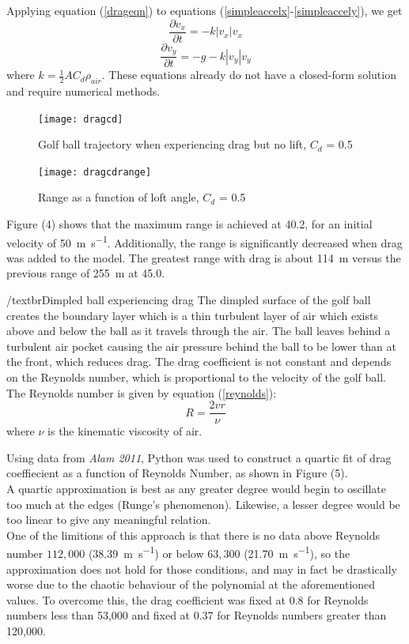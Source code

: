 \documentclass[12pt]{article}
\begin{document}
Applying equation (\ref{drageqn}) to equations (\ref{simpleaccelx}-\ref{simpleaccely}), we get
\begin{equation} \label{dragaccelx}
\frac{\partial v_x}{\partial t}=-k |v_x| v_x
\end{equation}
\begin{equation} \label{dragaccely}
\frac{\partial v_y}{\partial t}=-g-k |v_y| v_y
\end{equation}
where $k=\frac{1}{2} A C_d \rho_{air}$. These equations already do not have a closed-form solution and require numerical methods.
\begin{figure}[H]
\centering
\caption{Golf ball trajectory when experiencing drag but no lift, $C_d$ = 0.5}
\texttt{[image: dragcd]}
\end{figure}

\begin{figure}[H]
\centering
\caption{Range as a function of loft angle, $C_d$ = 0.5}
\texttt{[image: dragcdrange]}
\end{figure}

Figure (4) shows that the maximum range is achieved at 40.2\degree, for an initial velocity of \SI{50}{\metre\per\second}. Additionally, the range is significantly decreased when drag was added to the model. The greatest range with drag is about \SI{114}{\metre} versus the previous range of \SI{255}{\metre} at 45.0\degree.

/textbr{Dimpled ball experiencing drag}
The dimpled surface of the golf ball creates the boundary layer which is a thin turbulent layer of air which exists above and below the ball as it travels through the air. The ball leaves behind a turbulent air pocket causing the air pressure behind the ball to be lower than at the front, which reduces drag.
The drag coefficient is not constant and depends on the Reynolds number, which is proportional to the velocity of the golf ball. The Reynolds number is given by equation (\ref{reynolds})\cite{Alam2011}:
\begin{equation} \label{reynolds}
R=\frac{2vr}{\nu}
\end{equation}
where $\nu$ is the kinematic viscosity of air.

Using data from \textit{Alam 2011}\cite{Alam2011}, Python was used to construct a quartic fit of drag coeffiecient as a function of Reynolds Number, as shown in Figure (5).\\
A quartic approximation is best as any greater degree would begin to oscillate too much at the edges (Runge's phenomenon). Likewise, a lesser degree would be too linear to give any meaningful relation.\\
One of the limitions of this approach is that there is no data above Reynolds number $112,000$ (\SI{38.39}{\meter\per\second}) or below $63,300$ (\SI{21.70}{\meter\per\second}), so the approximation does not hold for those conditions, and may in fact be drastically worse due to the chaotic behaviour of the polynomial at the aforementioned values. To overcome this, the drag coefficient was fixed at 0.8 for Reynolds numbers less than 53,000 and fixed at 0.37 for Reynolds numbers greater than 120,000.
\end{document}
